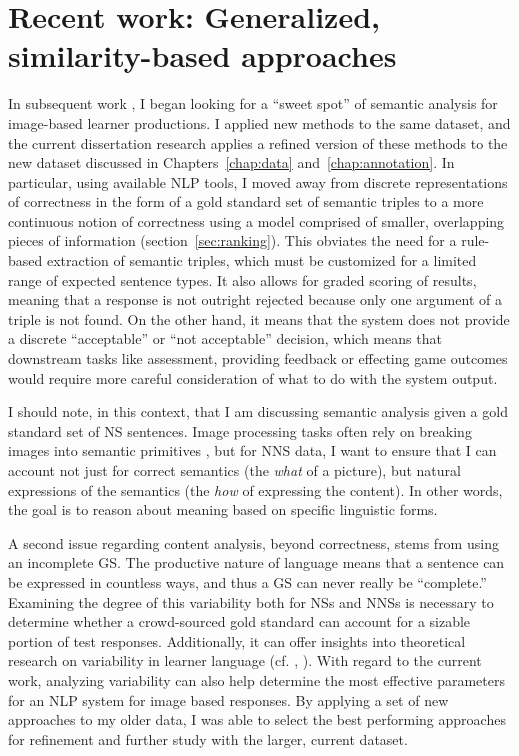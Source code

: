 \section{Recent work: Generalized, similarity-based approaches}


In subsequent work \citep{king:dickinson:16}, I began looking for a ``sweet spot'' of
semantic analysis \citep[cf.][]{bailey:meurers:08} for image-based learner productions. I applied new methods to the same dataset, and the current dissertation research applies a refined version of these methods to the new dataset discussed in Chapters~\ref{chap:data} and~\ref{chap:annotation}.
In particular, using available NLP tools, I moved away from discrete representations of correctness in the form of a gold standard set of semantic triples to a more continuous notion of correctness using a model comprised of smaller, overlapping pieces of information (section~\ref{sec:ranking}). This obviates the need for a rule-based extraction of semantic triples, which must be customized for a limited range of expected sentence types. It also allows for graded scoring of results, meaning that a response is not outright rejected because only one argument of a triple is not found. On the other hand, it means that the system does not provide a discrete ``acceptable'' or ``not acceptable'' decision, which means that downstream tasks like assessment, providing feedback or effecting game outcomes would require more careful consideration of what to do with the system output.

I should note, in this context, that I am discussing semantic
analysis given a gold standard set of NS sentences.  Image processing
tasks often rely on breaking images into semantic primitives
\citep[see, e.g.,][and references therein]{ortiz:wolff:lapata:15}, but
for NNS data, I want to ensure that I can account not just for
correct semantics (the \emph{what} of a picture), but natural
expressions of the semantics (the \emph{how} of expressing the
content).  In other words, the goal is to reason about meaning based on
specific linguistic forms.

A second issue regarding content analysis, beyond correctness, stems
from using an incomplete GS. The productive nature of language means that a sentence can be expressed in countless ways, and thus a GS can never really be ``complete.'' Examining the degree of this variability both for NSs and NNSs is necessary to determine whether a crowd-sourced gold standard can account for a sizable portion of test responses. Additionally, it can offer insights into theoretical research on variability in learner language (cf. \citet{ellis1987variability}, \citet{kanno1998consistency}). With regard to the current work, analyzing variability can also help determine the most effective parameters for an NLP system for image based responses. By applying a set of new approaches to my older data, I was able to select the best performing approaches for refinement and further study with the larger, current dataset.
 


